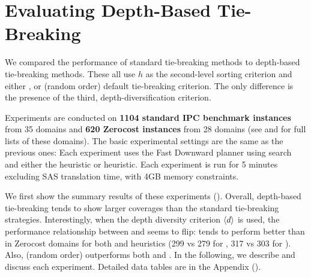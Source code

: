\section{Evaluating Depth-Based Tie-Breaking}
\label{sec:depth-based-evaluation}



We compared the performance of standard tie-breaking methods to depth-based tie-breaking methods. These all use $h$
as the second-level sorting criterion and either \fifo, \lifo or \ro (random order) default tie-breaking criterion.
The only difference is the presence of the third, depth-diversification criterion.

Experiments are conducted on \textbf{1104 standard IPC benchmark
instances} from 35 domains  and \textbf{620 Zerocost instances} from 28 domains (see  and  for full lists of these domains). 
The basic experimental settings are the same as the previous ones:
Each experiment uses the Fast Downward planner using \astar search and either the \lmcut heuristic or \mands heuristic.
Each experiment is run for 5 minutes excluding SAS translation time, with 4GB memory constraints.

We first show the summary results of these experiments ().
Overall, depth-based tie-breaking tends to show larger coverages than the
standard tie-breaking strategies.
Interestingly, when the depth diversity criterion ${\left<d\right>}$ is used, 
the performance relationship between \lifo and \fifo seems to flip:
\fifo tends to perform better than \lifo in Zerocost domains for both
\lmcut and \mands heuristics (299 vs 279 for \lmcut, 317 vs 303 for \mands).
Also, \ro (random order) outperforms both \fifo and \lifo.
In the following, we describe and discuss each experiment.
Detailed data tables are in the Appendix ().

